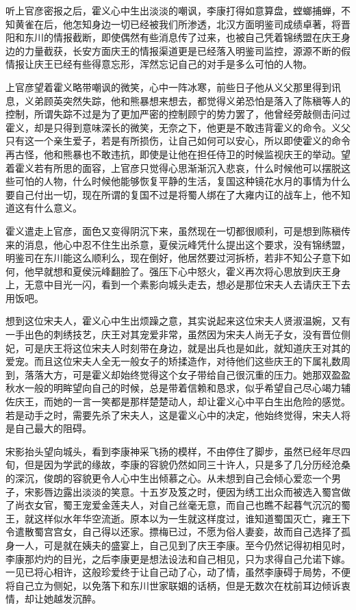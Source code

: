 听上官彦密报之后，霍义心中生出淡淡的嘲讽，李康打得如意算盘，螳螂捕蝉，不知黄雀在后，他怎知身边一切已经被我们所渗透，北汉方面明鉴司成绩卓著，将晋阳和东川的情报截断，即使偶然有些消息传了过来，也被自己凭着锦绣盟在庆王身边的力量截获，长安方面庆王的情报渠道更是已经落入明鉴司监控，源源不断的假情报让庆王已经有些得意忘形，浑然忘记自己的对手是多么可怕的人物。

上官彦望着霍义略带嘲讽的微笑，心中一阵冰寒，前些日子他从义父那里得到讯息，义弟顾英突然失踪，他和熊暴想来想去，都觉得义弟恐怕是落入了陈稹等人的控制，所谓失踪不过是为了更加严密的控制顾宁的势力罢了，他曾经旁敲侧击问过霍义，却是只得到意味深长的微笑，无奈之下，他更是不敢违背霍义的命令。义父只有这一个亲生爱子，若是有所损伤，让自己如何可以安心，所以即使霍义的命令再古怪，他和熊暴也不敢违抗，即使是让他在担任侍卫的时候监视庆王的举动。望着霍义若有所思的面容，上官彦只觉得心思渐渐沉入悲哀，什么时候他可以摆脱这些可怕的人物，什么时候他能够恢复平静的生活，复国这种镜花水月的事情为什么要自己付出一切，现在所谓的复国不过是将蜀人绑在了大雍内讧的战车上，他不知道这有什么意义。

霍义遣走上官彦，面色又变得阴沉下来，虽然现在一切都很顺利，可是想到陈稹传来的消息，他心中忍不住生出杀意，夏侯沅峰凭什么提出这个要求，没有锦绣盟，明鉴司在东川能这么顺利么，现在倒好，他居然要过河拆桥，若非不知公子意下如何，他早就想和夏侯沅峰翻脸了。强压下心中怒火，霍义再次将心思放到庆王身上，无意中目光一闪，看到一个素影向城头走去，想必是那位宋夫人去请庆王下去用饭吧。

想到这位宋夫人，霍义心中生出烦躁之意，其实说起来这位宋夫人贤淑温婉，又有一手出色的刺绣技艺，庆王对其宠爱非常，虽然因为宋夫人尚无子女，没有晋位侧妃，可是庆王将这位宋夫人时刻带在身边，就是出兵也是如此，就知道庆王对其的爱宠。而且这位宋夫人全无一般女子的矫揉造作，对待他们这些庆王的下属礼数周到，落落大方，可是霍义却始终觉得这个女子带给自己很沉重的压力。她那双盈盈秋水一般的明眸望向自己的时候，总是带着信赖和恳求，似乎希望自己尽心竭力辅佐庆王，而她的一言一笑都是那样楚楚动人，却让霍义心中平白生出危险的感觉。若是动手之时，需要先杀了宋夫人，这是霍义心中的决定，他始终觉得，宋夫人将是自己最大的阻碍。

宋影抬头望向城头，看到李康神采飞扬的模样，不由停住了脚步，虽然已经年尽四旬，但是因为学武的缘故，李康的容貌仍然如同三十许人，只是多了几分历经沧桑的深沉，俊朗的容貌更令人心中生出倾慕之心。从未想到自己会倾心爱恋一个男子，宋影唇边露出淡淡的笑意。十五岁及笈之时，便因为绣工出众而被选入蜀宫做了尚衣女官，蜀王宠爱金莲夫人，对自己丝毫无意，而自己也瞧不起暮气沉沉的蜀王，就这样似水年华空流逝。原本以为一生就这样度过，谁知道蜀国灭亡，雍王下令遣散蜀宫宫女，自己得以还家。摽梅已过，不愿为俗人妻妾，故而自己选择了孤身一人，可是就在姨夫的盛宴上，自己见到了庆王李康。至今仍然记得初相见时，李康那灼灼的目光，之后李康更是想法设法和自己相见，只为求得自己允诺下嫁。一见已将心相许，这般珍爱终于让自己动了心，动了情，虽然李康碍于局势，不便将自己立为侧妃，以免落下和东川世家联姻的话柄，但是无数次在枕前耳边倾诉衷情，却让她越发沉醉。

